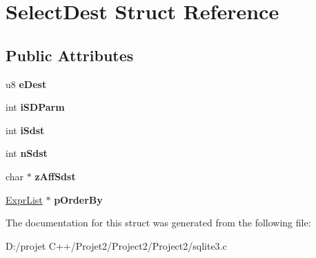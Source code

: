 \hypertarget{struct_select_dest}{}\section{Select\+Dest Struct Reference}
\label{struct_select_dest}
\subsection*{Public Attributes}
\begin{DoxyCompactItemize}
\item 
\mbox{\label{struct_select_dest_a779c1809acadd15898db0b20e31cc23f}} 
u8 {\bfseries e\+Dest}
\item 
\mbox{\label{struct_select_dest_ad30d63b2b7216a533a5ea476412664aa}} 
int {\bfseries i\+S\+D\+Parm}
\item 
\mbox{\label{struct_select_dest_adbc1c5f38b8c95da1d05e8c25dee400f}} 
int {\bfseries i\+Sdst}
\item 
\mbox{\label{struct_select_dest_aa4e7438446ef26231f7426edfda13e19}} 
int {\bfseries n\+Sdst}
\item 
\mbox{\label{struct_select_dest_ada0376591a63aacaf9f39f9b45bb7178}} 
char $\ast$ {\bfseries z\+Aff\+Sdst}
\item 
\mbox{\label{struct_select_dest_a10881e4ffff470814a592d6d7e1541fa}} 
\mbox{\hyperlink{struct_expr_list}{Expr\+List}} $\ast$ {\bfseries p\+Order\+By}
\end{DoxyCompactItemize}


The documentation for this struct was generated from the following file\+:\begin{DoxyCompactItemize}
\item 
D\+:/projet C++/\+Projet2/\+Project2/\+Project2/sqlite3.\+c\end{DoxyCompactItemize}
